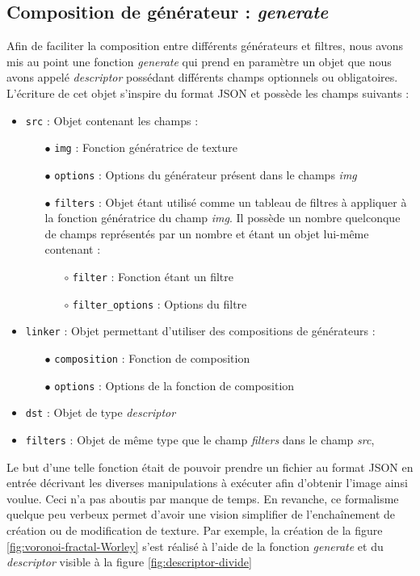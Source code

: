 \documentclass[11pt]{article}
\begin{document}
\subsection{Composition de générateur : \textit{generate}}
\label{sec:generate}
Afin de faciliter la composition entre différents générateurs et filtres, nous avons mis au point une fonction \textit{generate} qui prend en paramètre un objet que nous avons appelé \textit{descriptor} possédant différents champs optionnels ou obligatoires. L'écriture de cet objet s'inspire du format JSON et possède les champs suivants :
\begin{itemize}
    \item \texttt{src} : Objet contenant les champs :
    \begin{itemize}
        \item [$\bullet$] \texttt{img} : Fonction génératrice de texture
        \item [$\bullet$] \texttt{options} : Options du générateur présent dans le champs \textit{img}
        \item [$\bullet$] \texttt{filters} : Objet étant utilisé comme un tableau de filtres à appliquer à la fonction génératrice du champ \textit{img}. Il possède un nombre quelconque de champs représentés par un nombre et étant un objet lui-même contenant :
        \begin{itemize}
            \item [$\circ$] \texttt{filter} : Fonction étant un filtre
            \item [$\circ$] \texttt{filter\_options} : Options du filtre
        \end{itemize}
    \end{itemize}
    \item \texttt{linker} : Objet permettant d'utiliser des compositions de générateurs :
    \begin{itemize}
        \item [$\bullet$] \texttt{composition} : Fonction de composition
        \item [$\bullet$] \texttt{options} : Options de la fonction de composition
    \end{itemize}
    \item \texttt{dst} : Objet de type \textit{descriptor}
    \item \texttt{filters} : Objet de même type que le champ \textit{filters} dans le champ \textit{src}, 
\end{itemize}

\vspace{4mm}
Le but d'une telle fonction était de pouvoir prendre un fichier au format JSON en entrée décrivant les diverses manipulations à exécuter afin d'obtenir l'image ainsi voulue. Ceci n'a pas aboutis par manque de temps. En revanche, ce formalisme quelque peu verbeux permet d'avoir une vision simplifier de l'enchaînement de création ou de modification de texture. Par exemple, la création de la figure \ref{fig:voronoi-fractal-Worley} s'est réalisé à l'aide de la fonction \textit{generate} et du \textit{descriptor} visible à la figure \ref{fig:descriptor-divide}
\end{document}
